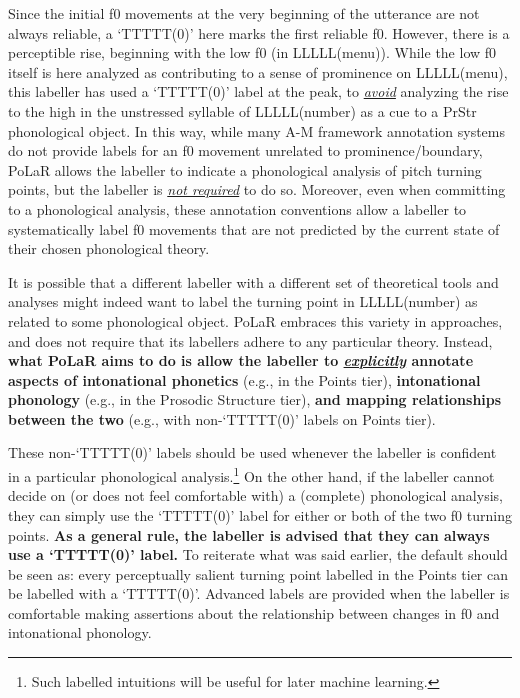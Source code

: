 \documentclass[11pt, twoside]{memoir}
\begin{document}
Since the initial f0 movements at the very beginning of the utterance are not always reliable, a ‘TTTTT(0)’ here marks the first reliable f0. However, there is a perceptible rise, beginning with the low f0 (in LLLLL(menu)). While the low f0 itself is here analyzed as contributing to a sense of prominence on LLLLL(menu), this labeller has used a ‘TTTTT(0)’ label at the peak, to \textit{\uline{avoid}} analyzing the rise to the high in the unstressed syllable of LLLLL(number) as a cue to a PrStr phonological object. In this way, while many A-M framework annotation systems do not provide labels for an f0 movement unrelated to prominence\slash boundary, PoLaR allows the labeller to indicate a phonological analysis of pitch turning points, but the labeller is \textit{\uline{not required}} to do so. Moreover, even when committing to a phonological analysis, these annotation conventions allow a labeller to systematically label f0 movements that are not predicted by the current state of their chosen phonological theory.

It is possible that a different labeller with a different set of theoretical tools and analyses might indeed want to label the turning point in LLLLL(number) as related to some phonological object. PoLaR embraces this variety in approaches, and does not require that its labellers adhere to any particular theory. Instead, \textbf{what PoLaR aims to do is allow the labeller to \textit{\uline{explicitly}} annotate aspects of intonational phonetics} (e.g., in the Points tier), \textbf{intonational phonology} (e.g., in the Prosodic Structure tier), \textbf{and mapping relationships between the two} (e.g., with non-‘TTTTT(0)’ labels on Points tier).

These non-‘TTTTT(0)’ labels should be used whenever the labeller is confident in a particular phonological analysis.\footnote{Such labelled intuitions will be useful for later machine learning.} On the other hand, if the labeller cannot decide on (or does not feel comfortable with) a (complete) phonological analysis, they can simply use the ‘TTTTT(0)’ label for either or both of the two f0 turning points. \textbf{As a general rule, the labeller is advised that they can always use a ‘TTTTT(0)’ label.} To reiterate what was said earlier, the default should be seen as: every perceptually salient turning point labelled in the Points tier can be labelled with a ‘TTTTT(0)’. Advanced labels are provided when the labeller is comfortable making assertions about the relationship between changes in f0 and intonational phonology.
\end{document}
